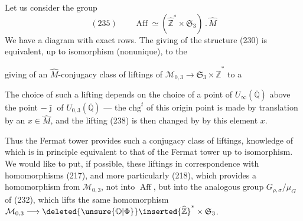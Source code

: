 Let us consider the group
\[
(235)\qquad
\operatorname{Aff}\simeq
(\widehat{\mathbb Z}^{*}\times\mathfrak S_3)\mathbin{.}\widehat M
\]
We have a diagram
with exact rows. The giving of the structure (230) is equivalent,
up to isomorphism (nonunique), to the



giving of an $\widehat M$-conjugacy class of liftings
of $\mathcal M_{0,3}\longrightarrow\mathfrak S_3\times\widehat{\mathbb Z}^{*}$
to a

The choice of such a lifting depends on the choice of a point of
$U_\infty(\overline{\mathbb Q})$ above the point $-\bar{\jmath}$
of $U_{0,3}(\overline{\mathbb Q})$ --- the $\mathrm{chg}^{t}$ of this
origin point is made by translation by an $x\in\widehat M$,
and the lifting (238) is then changed by 
by this element $x$.

Thus the Fermat tower provides such a conjugacy class
of liftings, knowledge of which is in principle equivalent
to that of the Fermat tower up to isomorphism. We would like to put,
if possible, these liftings in correspondence with
 homomorphisms (217), and more particularly
 (218), which provides a
 homomorphism from $\mathcal M_{0,3}$, not into
 $\operatorname{Aff}$, but into
the analogous group $G_{\rho,\sigma}/\mu_G$ of (232), which lifts
the same homomorphism
$\mathcal M_{0,3}\longrightarrow
\deleted{\unsure{\mathbb O|\Phi}}\inserted{\widehat{\mathbb Z}}^{*}\times\mathfrak S_3$.

